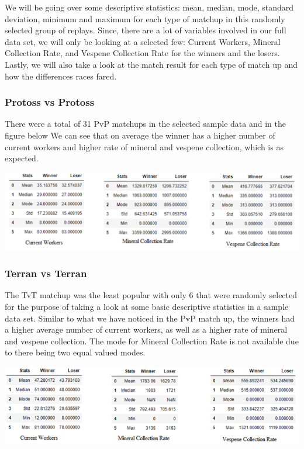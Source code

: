 \documentclass[a4paper,12pt]{report}
\begin{document}
We will be going over some descriptive statistics: mean, median, mode, standard deviation, minimum and maximum for each type of matchup in this randomly selected group of replays. Since, there are a lot of variables involved in our full data set, we will only be looking at a selected few: Current Workers, Mineral Collection Rate, and Vespene Collection Rate for the winners and the losers. Lastly, we will also take a look at the match result for each type of match up and how the differences races fared. 

\subsubsection{Protoss vs Protoss}
There were a total of 31 PvP matchups in the selected sample data and in the figure below We can see that on average the winner has a higher number of current workers and higher rate of mineral and vespene collection, which is as expected. 

\begin{center}
    \captionsetup{type=figure}
    \includegraphics[width=.9\linewidth]{media/WorkersCollection.png}
\end{center}

\subsubsection{Terran vs Terran}
The TvT matchup was the least popular with only 6 that were randomly selected for the purpose of taking a look at some basic descriptive statistics in a sample data set. Similar to what we have noticed in the PvP match up, the winners had a higher average number of current workers, as well as a higher rate of mineral and vespene collection. The mode for Mineral Collection Rate is not available due to there being two equal valued modes. 

\begin{center}
    \captionsetup{type=figure}
    \includegraphics[width=.9\linewidth]{media/WorkersCollectionTvT.png}
\end{center}
\end{document}
